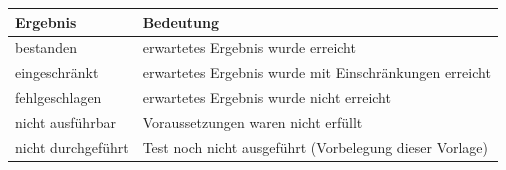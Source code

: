 \documentclass[
  a4paper,
  12pt,
  DIV=12,        %
  parskip=half,  %
  headings=small %
]{scrartcl}
\theoremstyle{definition}
\theoremstyle{definition}
\begin{document}
\begin{longtable}[]{@{}p{}p{}@{}}
\toprule
\textbf{Ergebnis} & \textbf{Bedeutung}\\
\midrule
\endhead
\bottomrule
\endfoot
bestanden & erwartetes Ergebnis wurde erreicht\\
eingeschränkt & erwartetes Ergebnis wurde mit Einschränkungen erreicht\\
fehlgeschlagen & erwartetes Ergebnis wurde nicht erreicht\\
nicht ausführbar & Voraussetzungen waren nicht erfüllt\\
nicht durchgeführt & Test noch nicht ausgeführt (Vorbelegung dieser Vorlage)\\
\end{longtable}

\begin{landscape}

\end{landscape}
\end{document}
